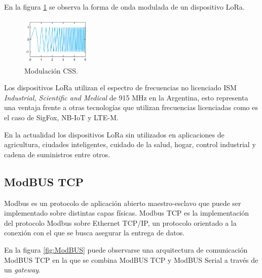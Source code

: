 En la figura \ref{fig:LoRa} se observa la forma de onda modulada de un dispositivo LoRa. 

\begin{figure}[htbp]
	\centering
	\includegraphics[width=0.3\textwidth]{./Figures/LoRa.png}
	\caption{Modulación CSS.}
	\label{fig:LoRa}
\end{figure} 

Los dispositivos LoRa utilizan el espectro de frecuencias no licenciado ISM  \textit{Industrial, Scientific and Medical} de 915 MHz en la Argentina, esto representa una ventaja frente a otras tecnologías que utilizan frecuencias licenciadas como es el caso de SigFox, NB-IoT y LTE-M.

%
%

En la actualidad los dispositivos LoRa sin utilizados en aplicaciones de agricultura, ciudades inteligentes, cuidado de la salud, hogar, control industrial y cadena de suministros entre otros.


\subsection{ModBUS TCP}

Modbus es un protocolo de aplicación abierto maestro-esclavo que puede ser implementado sobre distintas capas físicas.
Modbus TCP es la implementación del protocolo Modbus sobre Ethernet TCP/IP, un protocolo orientado a la conexión con el que se busca asegurar la entrega de datos. 

En la figura \ref{fig:ModBUS} puede observarse una arquitectura de comunicación ModBUS TCP en la que se combina ModBUS TCP y ModBUS Serial a través de un \textit{gateway}\citep{mbus}.

